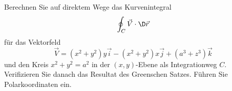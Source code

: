 \begin{atiTask}[
  title = Kurvenintegral mit Polarkoordinaten,
  call = Zusatzaufgabe,
]
Berechnen Sie auf direktem Wege das Kurvenintegral 
\[
\oint_C \vec{V}\cdot \D \vec{r}
\]
für das Vektorfeld 
\[
\vec{V}=(x^2+y^2)y\vec{i}-(x^2+y^2)x\vec{j}+(a^3+z^3)\vec{k}
\]
und den Kreis $x^2+y^2=a^2$ in der $(x,y)$-Ebene als Integrationweg $C$. Verifizieren Sie danach das Resultat des Greenschen Satzes. Führen Sie Polarkoordinaten ein.
\end{atiTask}